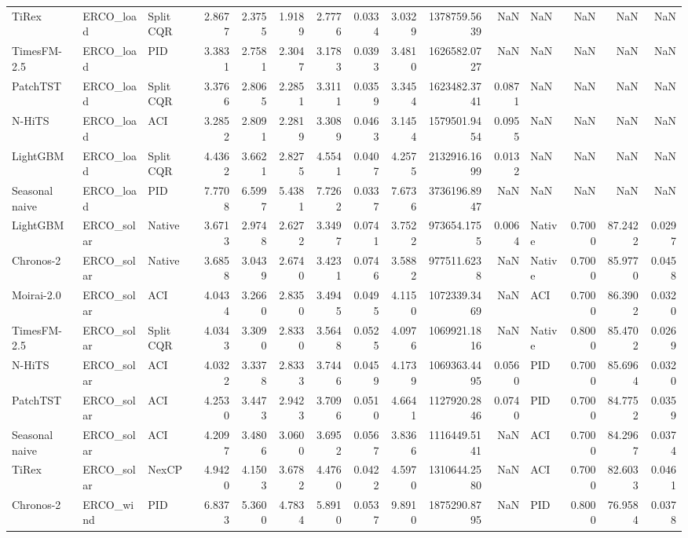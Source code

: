 \begin{tabular}{lllrrrrrrrrlrrr}
TiRex & ERCO_load & Split CQR & 2.8677 & 2.3755 & 1.9189 & 2.7776 & 0.0334 & 3.0329 & 1378759.5639 & NaN & NaN & NaN & NaN & NaN \\
TimesFM-2.5 & ERCO_load & PID & 3.3831 & 2.7581 & 2.3047 & 3.1783 & 0.0393 & 3.4810 & 1626582.0727 & NaN & NaN & NaN & NaN & NaN \\
PatchTST & ERCO_load & Split CQR & 3.3766 & 2.8065 & 2.2851 & 3.3111 & 0.0359 & 3.3454 & 1623482.3741 & 0.0871 & NaN & NaN & NaN & NaN \\
N-HiTS & ERCO_load & ACI & 3.2852 & 2.8091 & 2.2819 & 3.3089 & 0.0463 & 3.1454 & 1579501.9454 & 0.0955 & NaN & NaN & NaN & NaN \\
LightGBM & ERCO_load & Split CQR & 4.4362 & 3.6621 & 2.8275 & 4.5541 & 0.0407 & 4.2575 & 2132916.1699 & 0.0132 & NaN & NaN & NaN & NaN \\
Seasonal naive & ERCO_load & PID & 7.7708 & 6.5997 & 5.4381 & 7.7262 & 0.0337 & 7.6736 & 3736196.8947 & NaN & NaN & NaN & NaN & NaN \\
LightGBM & ERCO_solar & Native & 3.6713 & 2.9748 & 2.6272 & 3.3497 & 0.0741 & 3.7522 & 973654.1755 & 0.0064 & Native & 0.7000 & 87.2422 & 0.0297 \\
Chronos-2 & ERCO_solar & Native & 3.6858 & 3.0439 & 2.6740 & 3.4231 & 0.0746 & 3.5882 & 977511.6238 & NaN & Native & 0.7000 & 85.9770 & 0.0458 \\
Moirai-2.0 & ERCO_solar & ACI & 4.0434 & 3.2660 & 2.8350 & 3.4945 & 0.0495 & 4.1150 & 1072339.3469 & NaN & ACI & 0.7000 & 86.3902 & 0.0320 \\
TimesFM-2.5 & ERCO_solar & Split CQR & 4.0343 & 3.3090 & 2.8330 & 3.5648 & 0.0525 & 4.0976 & 1069921.1816 & NaN & Native & 0.8000 & 85.4702 & 0.0269 \\
N-HiTS & ERCO_solar & ACI & 4.0322 & 3.3378 & 2.8333 & 3.7446 & 0.0459 & 4.1739 & 1069363.4495 & 0.0560 & PID & 0.7000 & 85.6964 & 0.0320 \\
PatchTST & ERCO_solar & ACI & 4.2530 & 3.4473 & 2.9423 & 3.7096 & 0.0510 & 4.6641 & 1127920.2846 & 0.0740 & PID & 0.7000 & 84.7752 & 0.0359 \\
Seasonal naive & ERCO_solar & ACI & 4.2097 & 3.4806 & 3.0600 & 3.6952 & 0.0567 & 3.8366 & 1116449.5141 & NaN & ACI & 0.7000 & 84.2967 & 0.0374 \\
TiRex & ERCO_solar & NexCP & 4.9420 & 4.1503 & 3.6782 & 4.4760 & 0.0422 & 4.5970 & 1310644.2580 & NaN & ACI & 0.7000 & 82.6033 & 0.0461 \\
Chronos-2 & ERCO_wind & PID & 6.8373 & 5.3600 & 4.7834 & 5.8910 & 0.0537 & 9.8910 & 1875290.8795 & NaN & PID & 0.8000 & 76.9584 & 0.0378 \\

\end{tabular}
